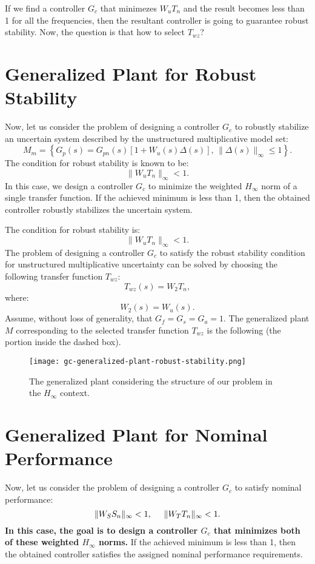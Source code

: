 If we find a controller $G_c$ that minimezes $W_uT_n$ and the result becomes less than 1 for all the frequencies, then the resultant controller is going to guarantee robust stability. Now, the question is that how to select $T_{wz}$?
\section{Generalized Plant for Robust Stability}
Now, let us consider the problem of designing a controller $G_c$ to robustly stabilize an uncertain system described by the unstructured multiplicative model set:
\[
M_m = \left\{G_p(s) = G_{pn}(s)[1 + W_u(s)\Delta(s)],\,\|\Delta(s)\|_\infty \leq 1\right\}.
\]
The condition for robust stability is known to be:
\[
\|W_uT_n\|_\infty < 1.
\]
In this case, we design a controller $G_c$ to minimize the weighted $H_\infty$ norm of a single transfer function. If the achieved minimum is less than 1, then the obtained controller robustly stabilizes the uncertain system.

The condition for robust stability is:
\[
\|W_uT_n\|_\infty < 1.
\]
The problem of designing a controller $G_c$ to satisfy the robust stability condition for unstructured multiplicative uncertainty can be solved by choosing the following transfer function $T_{wz}$:
\[
T_{wz}(s) = W_2T_n,
\]
where:
\[
W_2(s) = W_u(s).
\]
Assume, without loss of generality, that $G_f = G_s = G_a = 1$. The generalized plant $M$ corresponding to the selected transfer function $T_{wz}$ is the following (the portion inside the dashed box).

\begin{figure}[H]
    \centering
    \texttt{[image: gc-generalized-plant-robust-stability.png]}
    \caption{The generalized plant considering the structure of our problem in the $H_\infty$ context.}
\end{figure}

\section{Generalized Plant for Nominal Performance}
Now, let us consider the problem of designing a controller $G_c$ to satisfy nominal performance:
\[
\|W_SS_n\|_\infty < 1, \hspace{0.5cm} \|W_TT_n\|_\infty < 1.
\]
\textbf{In this case, the goal is to design a controller $G_c$ that minimizes both of these weighted $H_\infty$ norms.} If the achieved minimum is less than 1, then the obtained controller satisfies the assigned nominal performance requirements.

